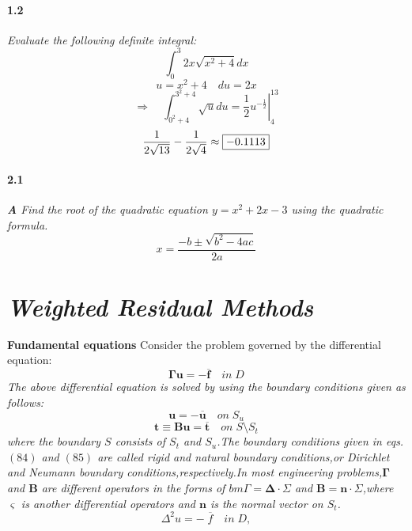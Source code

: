\documentclass{article}
\begin{document}
\paragraph{1.2}
	\textit{
		Evaluate the following definite integral:
		$$
		\int_{0}^{3} 2x \sqrt{x^2+4} dx
		$$
	}
	$$
		u = x^2 + 4
		\quad %
		du = 2x 
	$$
	$$
		\Rightarrow\quad
		\int_{0^2+4}^{3^2+4} \sqrt{u} du 
		= \left. \frac{1}{2} u^{-\frac{1}{2}}
		\right|_{4}^{13}
	$$
	$$
	 \frac{1}{2\sqrt{13}}-
	 \frac{1}{2\sqrt{4}}
	 \approx \framebox{$-0.1113$}
	$$
\paragraph{2.1}
\textit{
	\textbf{A} Find the root of the 
	quadratic equation $y=x^2 +2x -3 $
	using the quadratic formula.
}
$$
	x = \frac{-b\pm\sqrt{b^2-4ac}}{2a}
$$
\section{\textit{Weighted Residual Methods}}
\textbf{Fundamental equations} Consider the problem governed by the differential equation:
$$ \bm{\Gamma u = -\overline{f}}\quad in\;D $$
\textit{The above differential equation is solved by using the boundary conditions given as follows:}
$$
\bm{u=-\overline{u}}\quad on\;S_u
$$
$$
\bm{t\equiv Bu = \overline{t}}\quad on\;S\!\setminus\!S_t
$$
\textit{where the boundary $S$ consists of $S_t$ and $S_u$.\;The boundary conditions given in eqs.$(84)$ and $(85)$ are called rigid and natural boundary conditions,or Dirichlet and Neumann
boundary conditions,respectively.\;In most engineering problems,$\bm{\Gamma}$ and $\bm{B}$ are different operators in the forms of $bm{\Gamma} = \bm{\Delta\cdot\varSigma}$ and $\bm{B}=
\bm{n\cdot\varSigma}$,where $\varsigma$ is another differential operators and $\bm{n}$ is the normal vector on $S_t$.}
$$
\Delta^2 u = -\;\overline{f}\quad in\;D,
$$
\end{document}
